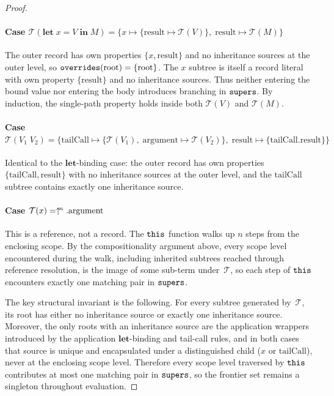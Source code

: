 \begin{proof}
  \paragraph{Case
    $\mathcal{T}(\mathbf{let}\; x = V
    \;\mathbf{in}\; M)
    = \{x \mapsto \{\mathrm{result} \mapsto \mathcal{T}(V)\},\;
  \mathrm{result} \mapsto \mathcal{T}(M)\}$}
  The outer record has own properties $\{x, \mathrm{result}\}$
  and no inheritance sources at the outer level, so
  $\mathtt{overrides}(\text{root}) = \{\text{root}\}$.
  The $x$ subtree is itself a record literal with own
  property $\{\mathrm{result}\}$ and no inheritance
  sources.
  Thus neither entering the bound value nor entering the
  body introduces branching in $\mathtt{supers}$.
  By induction, the single-path property holds inside both
  $\mathcal{T}(V)$ and $\mathcal{T}(M)$.

  \paragraph{Case $\mathcal{T}(V_1\; V_2) =
    \{\mathrm{tailCall} \mapsto
      \{\mathcal{T}(V_1),\; \mathrm{argument} \mapsto
      \mathcal{T}(V_2)\},\;
      \mathrm{result} \mapsto
  \{\mathrm{tailCall}.\mathrm{result}\}\}$}
  Identical to the $\mathbf{let}$-binding case: the outer record
  has own properties $\{\mathrm{tailCall}, \mathrm{result}\}$
  with no inheritance sources at the outer level, and the
  $\mathrm{tailCall}$ subtree contains exactly one inheritance
  source.

  \paragraph{Case $\mathcal{T}(x)
  = \uparrow^{\!n}.\mathrm{argument}$}
  This is a reference, not a record.
  The $\mathtt{this}$ function walks up $n$ steps from the enclosing scope.
  By the compositionality argument above, every scope level
  encountered during the walk, including inherited subtrees
  reached through reference resolution, is the image of some
  sub-term under~$\mathcal{T}$, so each step of $\mathtt{this}$
  encounters exactly one matching pair in $\mathtt{supers}$.

  \medskip\noindent
  The key structural invariant is the following.
  For every subtree generated by~$\mathcal{T}$,
  its root has either no inheritance source or exactly one
  inheritance source.
  Moreover, the only roots with an inheritance source are the
  application wrappers introduced by the application
  $\mathbf{let}$-binding and tail-call rules, and in both cases
  that source is unique and encapsulated under a distinguished
  child ($x$ or $\mathrm{tailCall}$), never at the enclosing
  scope level.
  Therefore every scope level traversed by $\mathtt{this}$ contributes
  at most one matching pair in $\mathtt{supers}$, so the frontier set
  remains a singleton throughout evaluation.
\end{proof}

